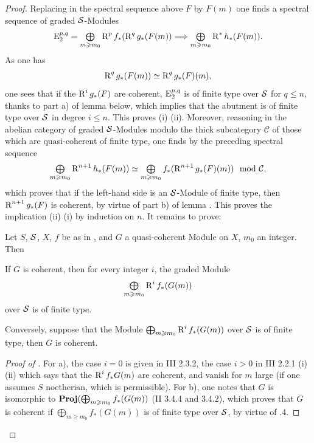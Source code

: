 \begin{proof}
Replacing in the spectral sequence above $F$ by $F(m)$ one
finds a spectral sequence of graded ${\mathcal S}$-Modules
\[
\E_2^{p, q}= \tbigoplus_{m\geq m_0} \R^pf_\ast(\R^qg_\ast(F(m)) \To \tbigoplus_{m\geq m_0} \R^\ast h_\ast(F(m)).
\]
As one has
\[
\operatorname{R}^qg_\ast(F(m)) \simeq \operatorname{R}^qg_\ast(F) (m),
\]
one sees that if the $\operatorname{R}^ig_\ast(F)$ are coherent, $\operatorname{E}_2^{p, q}$ is of finite type over ${\mathcal S}$ for $q\leq n$, thanks to part a) of lemma  below, which implies that the abutment is of finite type over ${\mathcal S}$ in degree $i\leq n$. This proves (i) \ALORS (ii). Moreover, reasoning in the abelian category of graded ${\mathcal S}$-Modules modulo the thick subcategory $\mathcal{C}$ of those which are quasi-coherent of finite type, one finds by the preceding spectral sequence
\[
\mathop{\textstyle\bigoplus}\limits_{m\geqslant m_0} \operatorname{R}^{n+1} h_\ast(F(m)) \simeq \mathop{\textstyle\bigoplus}\limits_{m\geqslant m_0} f_\ast (\operatorname{R}^{n+1} g_\ast(F)(m)) \mod \mathcal{C},
\]
which proves that if the left-hand side is an ${\mathcal S}$-Module of finite type, then $\operatorname{R}^{n+1} g_\ast(F)$ is coherent, by virtue of part b) of lemma . This proves the implication (ii) \ALORS (i) by induction on $n$. It remains to prove:

\begin{lemma} \label{XII.5.3} Let $S$, ${\mathcal S}$, $X$, $f$ be as in , and $G$ a quasi-coherent Module on $X$, $m_0$ an integer. Then
\begin{enumeratea}
\item
If $G$ is coherent, then for every integer $i$, the graded Module
\[
\mathop{\textstyle\bigoplus}\limits_{m\geqslant m_0} \operatorname{R}^i f_\ast(G(m))
\]
over ${\mathcal S}$ is of finite type.
\item
Conversely, suppose that the Module $\bigoplus_{m\geqslant m_0} \operatorname{R}^i f_\ast(G(m))$ over ${\mathcal S}$ is of finite type, then $G$ is coherent.
\end{enumeratea}
\end{lemma}

\begin{proof}[Proof of ]
For a), the case $i=0$ is given in \EGA III 2.3.2, the case $i>0$ in \EGA III 2.2.1 (i)(ii) which says that the $ \operatorname{R}^i f_\ast G(m)$ are coherent, and vanish for $m$ large (if one assumes $S$ noetherian, which is permissible). For b), one notes that $G$ is isomorphic to $\operatorname{\mathbf{Proj}} (\bigoplus_{m\geqslant m_0}f_\ast(G(m))$ (\EGA II 3.4.4 and 3.4.2), which proves that $G$ is coherent if $\bigoplus_{m\geq m_0}f_\ast(G(m))$ is of finite type over ${\mathcal S}$, by virtue of .4.
\skipqed
\end{proof}
\skipqed
\end{proof}

